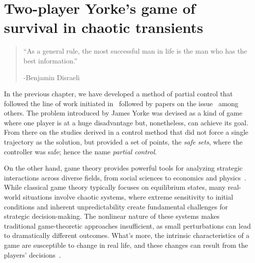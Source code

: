 \chapter{Two-player Yorke's game of survival in chaotic transients} %
\label{chap:PartialControlGame}


\begin{quotation}

	\vspace{-3cm}
	\begin{flushright}
    \begin{minipage}[t][5cm][b]{0.5\textwidth}
    { ``As a general rule, the most successful man in life is the man who has the best information.''}
    
    \bigskip
    
    -{\small  Benjamin Disraeli}
    \end{minipage}
    \end{flushright}



    \vspace{0.5cm}

\end{quotation}


\vspace{0.5cm}

\let\thefootnote\relax{}

\vspace{1cm}


In the previous chapter, we have developed a method of partial control that followed the line of work initiated in~\cite{Yorke} followed by papers on the issue~\cite{DynamicsPartialControl,PartialControlBeyond,PartialControlFunctions} among others. The problem introduced by James Yorke was devised as a kind of game where one player is at a huge disadvantage but, nonetheless, can achieve its goal. From there on the studies derived in a control method that did not force a single trajectory as the solution, but provided a set of points, the \textit{safe sets}, where the controller was safe; hence the name \textit{partial control}.

On the other hand, game theory provides powerful tools for analyzing strategic interactions across diverse fields, from social sciences to economics and physics~\cite{Social,EconomyGames,GamesComplex}. While classical game theory typically focuses on equilibrium states, many real-world situations involve chaotic systems, where extreme sensitivity to initial conditions and inherent unpredictability create fundamental challenges for strategic decision-making. The nonlinear nature of these systems makes traditional game-theoretic approaches insufficient, as small perturbations can lead to dramatically different outcomes. What's more, the intrinsic characteristics of a game are susceptible to change in real life, and these changes can result from the players' decisions~\cite{AkiyamaKaneko1,AkiyamaKaneko2}.

